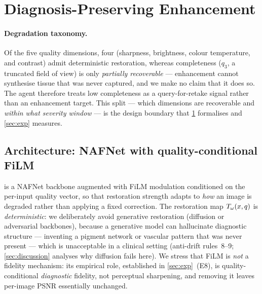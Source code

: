 
\section{Diagnosis-Preserving Enhancement}\label{sec:enhance}

\paragraph{Degradation taxonomy.}
Of the five quality dimensions, four (sharpness, brightness, colour temperature, and contrast)
admit deterministic restoration, whereas completeness ($q_3$, a truncated field of view) is only
\emph{partially recoverable} --- enhancement cannot synthesise tissue that was never captured, and we
make no claim that it does so. The agent therefore treats low completeness as a query-for-retake
signal rather than an enhancement target. This split --- which dimensions are recoverable and
\emph{within what severity window} --- is the design boundary that \cref{sec:enhance} formalises and
\cref{sec:exp} measures.

\subsection{Architecture: NAFNet with quality-conditional FiLM}\label{sec:arch}
\visienhance{} is a NAFNet backbone \citep{chen2022simple} augmented with FiLM modulation
\citep{perez2018film} conditioned on the per-input quality vector, so that restoration strength adapts
to \emph{how} an image is degraded rather than applying a fixed correction. The restoration map
$T_\omega(x,q)$ is \emph{deterministic}: we deliberately avoid generative restoration (diffusion or
adversarial backbones), because a generative model can hallucinate diagnostic structure --- inventing a
pigment network or vascular pattern that was never present --- which is unacceptable in a clinical
setting (anti-drift rules~8--9; \cref{sec:discussion} analyses why diffusion fails here). We stress that
FiLM is \emph{not} a fidelity mechanism: its empirical role, established in \cref{sec:exp}~(E8), is
quality-conditional \emph{diagnostic} fidelity, not perceptual sharpening, and removing it leaves
per-image PSNR essentially unchanged.

